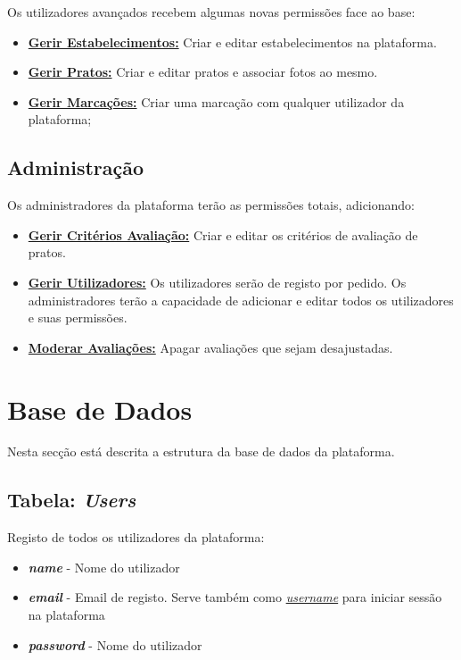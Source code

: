 \documentclass[11pt, a4paper, sans]{article}
\begin{document}
	Os utilizadores avançados recebem algumas novas permissões face ao base:

	\begin{itemize}
		\item \underline{\textbf{Gerir Estabelecimentos:}} Criar e editar estabelecimentos na plataforma.
		\item \underline{\textbf{Gerir Pratos:}} Criar e editar pratos e associar fotos ao mesmo.
		\item \underline{\textbf{Gerir Marcações:}} Criar uma marcação com qualquer utilizador da plataforma;
	\end{itemize}

	\subsection{Administração}
	Os administradores da plataforma terão as permissões totais, adicionando:
	\begin{itemize}
		\item \underline{\textbf{Gerir Critérios Avaliação:}} Criar e editar os critérios de avaliação de pratos.
		\item \underline{\textbf{Gerir Utilizadores:}} Os utilizadores serão de registo por pedido. Os administradores
			terão a capacidade de adicionar e editar todos os utilizadores e suas permissões.
		\item \underline{\textbf{Moderar Avaliações:}} Apagar avaliações que sejam desajustadas.
	\end{itemize}

	\section{Base de Dados}

	Nesta secção está descrita a estrutura da base de dados da plataforma.

	\subsection{Tabela: \textit{Users}} \label{db-table-users}

	Registo de todos os utilizadores da plataforma:

	\begin{itemize}
		\item \textbf{\textit{name}} - Nome do utilizador
		\item \textbf{\textit{email}} - Email de registo. Serve também como \underline{\textit{username}} para 
			iniciar sessão na plataforma
		\item \textbf{\textit{password}} - Nome do utilizador
	\end{itemize}
\end{document}
